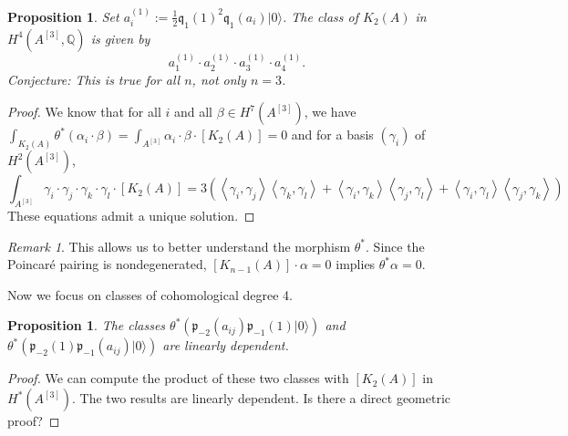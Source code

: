 \documentclass{amsart}
\newcommand{\hilb}[1]{^{[#1]}}
\newcommand{\vac}{|0\rangle}
\newcommand{\p}{\mathfrak{p}}
\newcommand{\pone}{ \mathfrak{p}_{ - 1} }
\newcommand{\kum}[2]{K_{ #2 }( #1 )}
\newcommand{\Q}{\mathbb{Q}}
\newcommand{\kq}{\mathfrak{q}}
\theoremstyle{plain}
\newtheorem{proposition}[theorem]{Proposition}
\theoremstyle{definition}
\theoremstyle{remark}
\newtheorem{remark}[theorem]{Remark}
\begin{document}
\begin{proposition}
Set $a_i^{(1)}:= \frac{1}{2}\kq_1(1)^2\kq_1(a_i)\vac$. The class of $\kum{A}{2}$ in $H^4(A\hilb{3},\Q)$ is given by
$$
a_1^{(1)}\cdot a_2^{(1)}\cdot a_3^{(1)}\cdot a_4^{(1)}.
$$ 
Conjecture: This is true for all $n$, not only $n=3$.
\end{proposition}
\begin{proof}
We know that for all $i$ and all $\beta\in H^7(A\hilb{3})$, we have $\int_ {\kum{A}{2}}\theta^*(\alpha_i\cdot\beta) = \int_ {A\hilb{3}}\alpha_i\cdot\beta \cdot[\kum{A}{2}]= 0$ and
for a basis $(\gamma_i) $ of  $H^2(A\hilb{3})$,
$$
\int_ {A\hilb{3}}\gamma_i\cdot\gamma_j\cdot\gamma_k\cdot\gamma_l\cdot[\kum{A}{2}] =
 3\left(\left<\gamma_i,\gamma_j\right>\left<\gamma_k,\gamma_l\right>+\left<\gamma_i,\gamma_k\right>\left<\gamma_j,\gamma_l\right>+\left<\gamma_i,\gamma_l\right>\left<\gamma_j,\gamma_k\right>  \right)
$$
These equations admit a unique solution.
\end{proof}
\begin{remark}
This allows us to better understand the morphism $\theta^*$. Since the Poincar\'e pairing is nondegenerated, $[\kum{A}{n-1}]\cdot \alpha=0$ implies $\theta^* \alpha =0$.
\end{remark}

Now we focus on classes of cohomological degree 4.
\begin{proposition}
The classes $\theta^* \left(\p_{-2}(a_{ij})\pone(1)\vac\right) $ and $\theta^*\left( \p_{-2}(1)\pone(a_{ij})\vac\right) $ are linearly dependent.
\end{proposition}
\begin{proof}
We can compute the product of these two classes with $[ \kum{A}{2} ] $ in $H^*(A\hilb{3})$. The two results are linearly dependent. Is there a direct geometric proof?
\end{proof}
\end{document}
